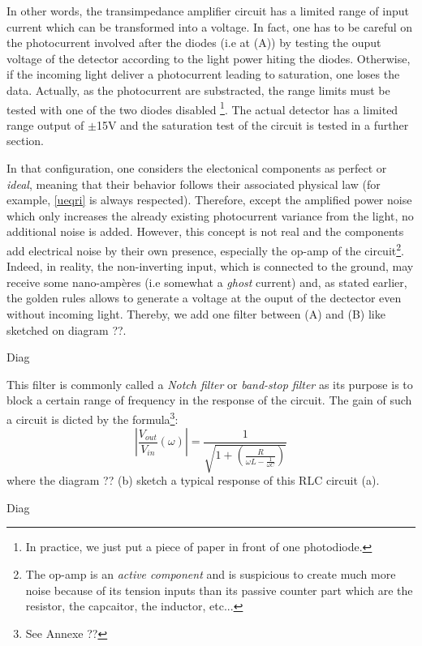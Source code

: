 \documentclass[12pt]{report}
\begin{document}
In other words, the transimpedance amplifier circuit has a limited range of input current which can be transformed into a voltage. In fact, one has to be careful on the photocurrent involved after the diodes (i.e at (A)) by testing the ouput voltage of the detector according to the light power hiting the diodes. Otherwise, if the incoming light deliver a photocurrent leading to saturation, one loses the data. Actually, as the photocurrent are substracted, the range limits must be tested with one of the two diodes disabled \footnote{In practice, we just put a piece of paper in front of one photodiode.}. The actual detector has a limited range output of $\pm$15V and the saturation test of the circuit is tested in a further section.

In that configuration, one considers the electonical components as perfect or \textit{ideal}, meaning that their behavior follows their associated physical law (for example, \eqref{ueqri} is always respected). Therefore, except the amplified power noise which only increases the already existing photocurrent variance from the light, no additional noise is added. However, this concept is not real and the components add electrical noise by their own presence, especially the op-amp of the circuit\footnote{The op-amp is an \textit{active component} and is suspicious to create much more noise because of its tension inputs than its passive counter part which are the resistor, the capcaitor, the inductor, etc...}. Indeed, in reality, the non-inverting input, which is connected to the ground, may receive some nano-ampères (i.e somewhat a \textit{ghost} current) and, as stated earlier, the golden rules allows to generate a voltage at the ouput of the dectector even without incoming light. Thereby, we add one filter between (A) and (B) like sketched on diagram ??.

Diag

This filter is commonly called a \textit{Notch filter} or \textit{band-stop filter} as its purpose is to block a certain range of frequency in the response of the circuit. The gain of such a circuit is dicted by the formula\footnote{See Annexe ??}:
\begin{equation}
\left\lvert \frac{V_{out}}{V_{in}} (\omega) \right\rvert = \frac{1}{\sqrt{1 + \left(\frac{R}{\omega L - \frac{1}{\omega C}}\right)}}
\end{equation}
where the diagram ?? (b) sketch a typical response of this RLC circuit (a).

Diag
\end{document}
